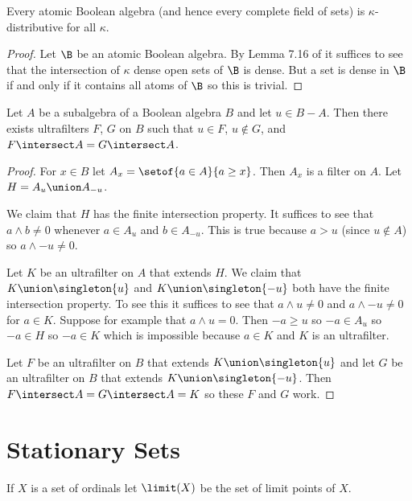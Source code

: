\documentclass[oneside,12pt]{amsart}
\begin{document}
\begin{lemma}
Every atomic Boolean algebra (and hence every complete field of sets) is
$\kappa$-distributive for all $\kappa$.
\end{lemma}
\begin{proof}
Let $\B$ be an atomic Boolean algebra. By Lemma 7.16 of \cite{Jech_Book2} it suffices to
see that the intersection of $\kappa$ dense open sets of $\B$ is dense. But a set is dense
in $\B$ if and
only if it contains all atoms of $\B$ so this is trivial.
\end{proof}

\begin{lemma} Let $A$ be a subalgebra of a Boolean algebra $B$
and let $u\in B - A$. Then there exists ultrafilters $F$, $G$ on $B$ such that $u\in F$, $u\notin G$,
and $F\intersect A = G\intersect A$.
\end{lemma}
\begin{proof}
For $x\in B$ let $A_x=\setof{a\in A}{a \geq x}$. Then $A_x$ is a filter on $A$.
Let $H = A_u \union A_{-u}$.

We claim that $H$ has the finite intersection property.
It suffices to see that $a\wedge b\not= 0$ whenever $a\in A_u$ and $b\in A_{-u}$.
This is true because $a > u$ (since $u\not\in A$) so $a\wedge -u \not = 0$.

Let $K$ be an ultrafilter on $A$ that extends $H$. We claim that $K\union\singleton{u}$
and $K\union\singleton{-u}$ both have the finite intersection property. To see this
it suffices to see that $a\wedge u \not=0$ and $a\wedge -u \not=0$ for $a\in K$. Suppose
for example that $a\wedge u = 0$. Then $-a \geq u$ so $-a \in A_u$ so $-a \in H$ so $-a \in K$
which is impossible because $a\in K$ and $K$ is an ultrafilter.

Let $F$ be an ultrafilter on $B$ that extends $K\union\singleton{u}$ and let $G$ be an ultrafilter
on $B$ that extends  $K\union\singleton{-u}$. Then $F\intersect A = G\intersect A = K$ so these $F$ and $G$ work.
\end{proof}


\section{Stationary Sets}

\begin{definition}
If $X$ is a set of ordinals let $\limit(X)$ be the set of limit points of $X$.
\end{definition}
\end{document}
